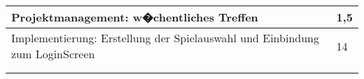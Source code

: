 \documentclass[a4paper,11pt]{scrartcl}
\begin{document}
\begin{longtable}{| p{13.8cm} | C{2.4cm} |}
  Projektmanagement: w�chentliches Treffen
	&
  1,5
	\\
	\hline

  Implementierung: Erstellung der Spielauswahl und Einbindung zum LoginScreen
	&
  14
	\\
	\hline


	&

	\\
	\hline


	&

	\\
	\hline

\end{longtable}
\end{document}

